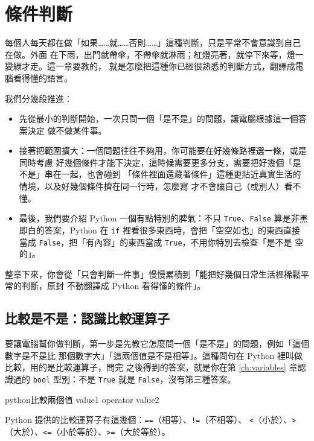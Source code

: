 \chapter{條件判斷}
\label{ch:conditionals}

每個人每天都在做「如果……就……否則……」這種判斷，只是平常不會意識到自己在做。外面
在下雨，出門就帶傘，不帶傘就淋雨；紅燈亮著，就停下來等，燈一變綠才走。這一章要教的，
就是怎麼把這種你已經很熟悉的判斷方式，翻譯成電腦看得懂的語言。

我們分幾段推進：
\begin{itemize}
\item 先從最小的判斷開始，一次只問一個「是不是」的問題，讓電腦根據這一個答案決定
做不做某件事。
\item 接著把範圍擴大：一個問題往往不夠用，你可能要在好幾條路裡選一條，或是同時考慮
好幾個條件才能下決定，這時候需要更多分支，需要把好幾個「是不是」串在一起，也會碰到
「條件裡面還藏著條件」這種更貼近真實生活的情境，以及好幾個條件擠在同一行時，怎麼寫
才不會讓自己（或別人）看不懂。
\item 最後，我們要介紹 Python 一個有點特別的脾氣：不只 \texttt{True}、\texttt{False}
算是非黑即白的答案，Python 在 \texttt{if} 裡看很多東西時，會把「空空如也」的東西直接
當成 \texttt{False}，把「有內容」的東西當成 \texttt{True}，不用你特別去檢查「是不是
空的」。
\end{itemize}

整章下來，你會從「只會判斷一件事」慢慢累積到「能把好幾個日常生活裡稀鬆平常的判斷，原封
不動翻譯成 Python 看得懂的條件」。

\section{比較是不是：認識比較運算子}
\label{sec:comparison-operators}

要讓電腦幫你做判斷，第一步是先教它怎麼問一個「是不是」的問題，例如「這個數字是不是比
那個數字大」「這兩個值是不是相等」。這種問句在 Python 裡叫做比較，用的是比較運算子，問完
之後得到的答案，就是你在第 \ref{ch:variables} 章認識過的 \texttt{bool} 型別：不是 \texttt{True} 就是
\texttt{False}，沒有第三種答案。

\begin{code}{python}{比較兩個值}
value1 operator value2
\end{code}

Python 提供的比較運算子有這幾個：\texttt{==}（相等）、\texttt{!=}（不相等）、
\texttt{<}（小於）、\texttt{>}（大於）、\texttt{<=}（小於等於）、\texttt{>=}（大於等於）。

